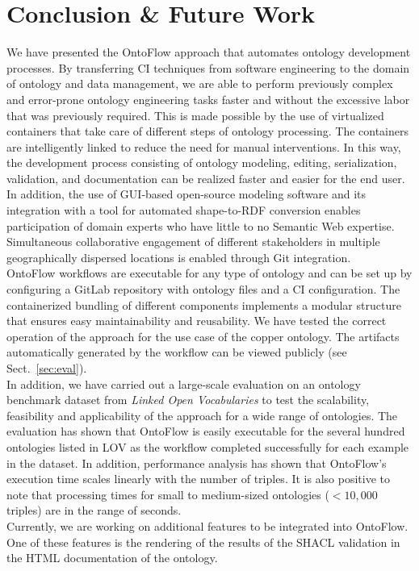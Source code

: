 \documentclass[runningheads]{llncs}
\begin{document}
\section{Conclusion \& Future Work}\label{sec:final}
We have presented the OntoFlow approach that automates ontology development processes. By transferring CI techniques from software engineering to the domain of ontology and data management, we are able to perform previously complex and error-prone ontology engineering tasks faster and without the excessive labor that was previously required. This is made possible by the use of virtualized containers that take care of different steps of ontology processing. The containers are intelligently linked to reduce the need for manual interventions. In this way, the development process consisting of ontology modeling, editing, serialization, validation, and documentation can be realized faster and easier for the end user. In addition, the use of GUI-based open-source modeling software and its integration with a tool for automated shape-to-RDF conversion enables participation of domain experts who have little to no Semantic Web expertise. Simultaneous collaborative engagement of different stakeholders in multiple geographically dispersed locations is enabled through Git integration.\\
OntoFlow workflows are executable for any type of ontology and can be set up by configuring a GitLab repository with ontology files and a CI configuration. The containerized bundling of different components implements a modular structure that ensures easy maintainability and reusability. We have tested the correct operation of the approach for the use case of the copper ontology. The artifacts automatically generated by the workflow can be viewed publicly (see Sect.~\ref{sec:eval}).\\
In addition, we have carried out a large-scale evaluation on an ontology benchmark dataset from \textit{Linked Open Vocabularies} to test the scalability, feasibility and applicability of the approach for a wide range of ontologies. The evaluation has shown that OntoFlow is easily executable for the several hundred ontologies listed in LOV as the workflow completed successfully for each example in the dataset. In addition, performance analysis has shown that OntoFlow's execution time scales linearly with the number of triples. It is also positive to note that processing times for small to medium-sized ontologies ($< 10,000$ triples) are in the range of seconds.\\
Currently, we are working on additional features to be integrated into OntoFlow. One of these features is the rendering of the results of the SHACL validation in the HTML documentation of the ontology.
\end{document}
